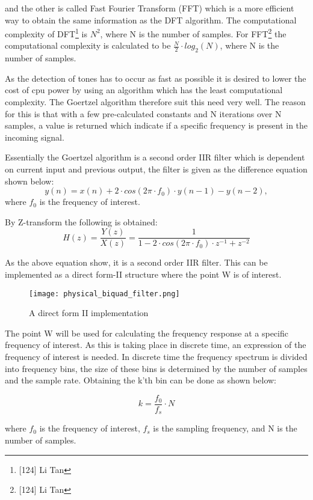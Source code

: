 	
	and the other is called Fast Fourier Transform (FFT) which is a more efficient way to obtain the same information
	as the DFT algorithm. The computational complexity of DFT\footnote{[124] Li Tan} is $N^2$, where N is the number of samples.
	For FFT\footnote{[124] Li Tan} the computational complexity is calculated to be $\frac{N}{2}\cdot log_{2}(N)$,
	where N is the number of samples.
	
	As the detection of tones has to occur as fast as possible it is desired to lower the cost of cpu power by using 
	an algorithm which has the least computational complexity. The Goertzel algorithm therefore suit this need very well.
	The reason for this is that with a few pre-calculated constants and N iterations over N samples, a value is returned
	which indicate if a specific frequency is present in the incoming signal.
	
	Essentially the Goertzel algorithm is a second order IIR filter which is dependent on current input and previous
	output, the filter is given as the difference equation shown below:
	\begin{equation}y(n) = x(n) + 2\cdot cos(2\pi \cdot f_{0})\cdot y(n - 1) - y(n - 2),\end{equation}
	where $f_{0}$ is the frequency of interest.
	
	By Z-transform the following is obtained:
	\begin{equation}H(z) = \frac{Y(z)}{X(z)} = \frac{1}{1 - 2\cdot cos(2\pi \cdot f_{0})\cdot z^{-1} + z^{-2}}\end{equation}
	
	
	As the above equation show, it is a second order IIR filter. This can be implemented as a direct form-II structure
	where the point W is of interest.
	
	\begin{figure}[htb]
		\begin{center}
		\texttt{[image: physical\_biquad\_filter.png]}%
		\caption{A direct form II implementation}
		\label{fig:physical_biquad_filter}
		\end{center}
	\end{figure}
	
	The point W will be used for calculating the frequency response at a specific frequency of interest. As this is taking
	place in discrete time, an expression of the frequency of interest is needed. In discrete time the frequency spectrum
	is divided into frequency bins, the size of these bins is determined by the number of samples and the sample rate.
	Obtaining the k'th bin can be done as shown below:
	\begin{center}\begin{equation}k = \frac{f_{0}}{f_{s}}\cdot N\end{equation}\end{center}
	where $f_{0}$ is the frequency of interest, $f_{s}$ is the sampling frequency, and N is the number of samples.
	
